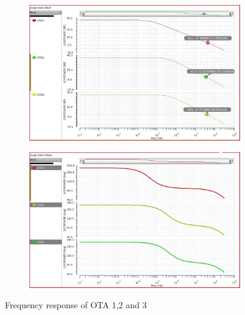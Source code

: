 \begin{figure}[H]
\centering
\begin{subfigure}[b]{0.85\textwidth}
   \includegraphics[width=\textwidth]{images/nom_GBW_1_2_3.jpg}
\end{subfigure}

\begin{subfigure}[b]{0.85\textwidth}
   \includegraphics[width=\textwidth]{images/nom_phase_1_2_3.jpg}
\end{subfigure}

\caption{Frequency response of OTA 1,2 and 3}
\label{frequrncy_out}
\end{figure}

